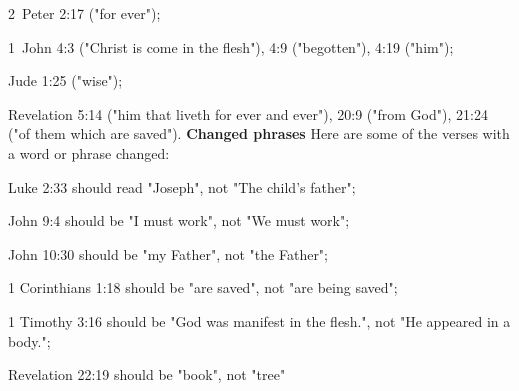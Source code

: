 {\begin{multicols}{2}
2~Peter 2:17 ("for ever"); \par
1~John 4:3 ("Christ is come in the flesh"), 4:9 ("begotten"), 4:19 ("him"); \par
Jude 1:25 ("wise"); \par
Revelation 5:14	("him that liveth for ever and ever"), 20:9 ("from God"), 21:24 ("of them which are saved").
\textbf{Changed phrases}
Here are some of the verses with a word or phrase changed:
\par
Luke 2:33 should read "Joseph", not "The child's father"; \par
John 9:4 should be "I must work", not "We must work"; \par
John 10:30 should be "my Father", not "the Father"; \par
1 Corinthians 1:18 should be "are saved", not "are being saved"; \par
1 Timothy 3:16 should be "God was manifest in the flesh.", not "He appeared in a body."; \par
Revelation 22:19 should be "book", not "tree" \par
\end{multicols}

}
